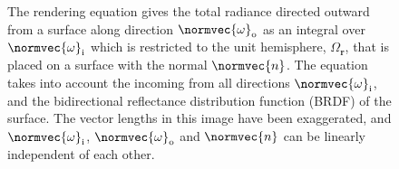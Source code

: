 \begin{figure}
    \caption{The rendering equation gives the total radiance directed outward from a surface along direction $\normvec{\omega}_{\text{o}}$ as an integral over $\normvec{\omega}_{\text{i}}$ which is restricted to the unit hemisphere, $\Omega_{\textbf{r}}$, that is placed on a surface with the normal $\normvec{n}$. The equation takes into account the  incoming from all directions $\normvec{\omega}_{\text{i}}$, and the bidirectional reflectance distribution function (BRDF) of the surface. The vector lengths in this image have been exaggerated, and $\normvec{\omega}_{\text{i}}$, $\normvec{\omega}_{\text{o}}$ and $\normvec{n}$ can be linearly independent of each other.}
    \label{fig:renderingequation}
\end{figure}

